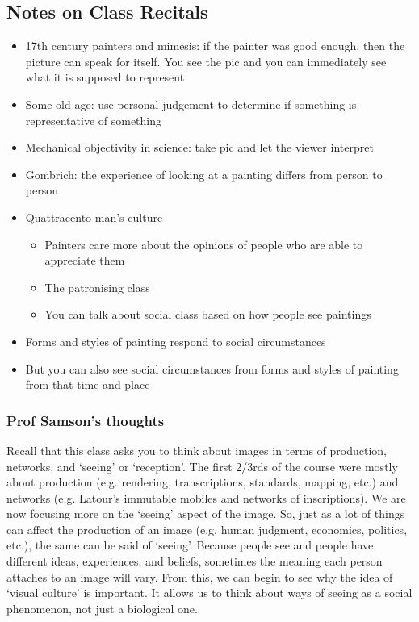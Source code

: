 \documentclass[a4paper]{article}
\begin{document}
\subsection{Notes on Class Recitals}
\begin{itemize}
	\item 17th century painters and mimesis: if the painter was good enough, then the picture can speak for itself. You see the pic and you can immediately see what it is supposed to represent
	\item Some old age: use personal judgement to determine if something is representative of something
	\item Mechanical objectivity in science: take pic and let the viewer interpret
	\item Gombrich: the experience of looking at a painting differs from person to person
	\item Quattracento man's culture
	\begin{itemize}[label=$\circ$]
		\item Painters care more about the opinions of people who are able to appreciate them
		\item The patronising class
		\item You can talk about social class based on how people see paintings 
	\end{itemize}
	\item Forms and styles of painting respond to social circumstances
	\item But you can also see social circumstances from forms and styles of painting from that time and place
\end{itemize}

\subsubsection{Prof Samson's thoughts}
Recall that this class asks you to think about images in terms of production, networks, and ‘seeing’ or ‘reception’. The first 2/3rds of the course were mostly about production (e.g. rendering, transcriptions, standards, mapping, etc.) and networks (e.g. Latour's immutable mobiles and networks of inscriptions). We are now focusing more on the `seeing' aspect of the image. So, just as a lot of things can affect the production of an image (e.g. human judgment, economics, politics, etc.), the same can be said of `seeing'. Because people see and people have different ideas, experiences, and beliefs, sometimes the meaning each person attaches to an image will vary. From this, we can begin to see why the idea of `visual culture' is important. It allows us to think about ways of seeing as a social phenomenon, not just a biological one.
\end{document}
